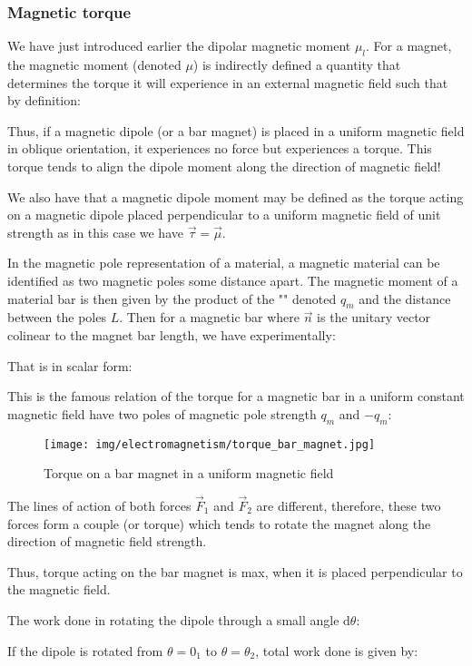 	\pagebreak
	\subsubsection{Magnetic torque}\label{magnetic torque}
	We have just introduced earlier the dipolar magnetic moment $\mu_l$. For a magnet, the magnetic moment (denoted $\mu$) is indirectly defined a quantity that determines the torque it will experience in an external magnetic field such that by definition:
	
	Thus, if a magnetic dipole (or a bar magnet) is placed in a uniform magnetic field in oblique orientation, it experiences no force but experiences a torque. This torque tends to align the dipole moment along the direction of magnetic field!
	
	We also have that a magnetic dipole moment may be defined as the torque acting on a magnetic dipole placed perpendicular to a uniform magnetic field of unit strength as in this case we have $\vec{\tau}=\vec{\mu}$.

	In the magnetic pole representation of a material, a magnetic material can be identified as two magnetic poles some distance apart. The magnetic moment of a material bar is then given by the product of the "" denoted $q_m$ and the distance between the poles $L$. Then for a magnetic bar where $\vec{n}$ is the unitary vector colinear to the magnet bar length, we have experimentally:
	
	That is in scalar form:
	
	This is the famous relation of the torque for a magnetic bar in a uniform constant magnetic field have two poles of magnetic pole strength $q_m$ and $-q_m$:
	\begin{figure}[H]
		\centering
		\texttt{[image: img/electromagnetism/torque\_bar\_magnet.jpg]}
		\caption{Torque on a bar magnet in a uniform magnetic field}
	\end{figure}
	The lines of action of both forces $\vec{F}_1$ and $\vec{F}_2$ are different, therefore, these two forces form a couple (or torque) which tends to rotate the magnet along the direction of magnetic field strength. 
	
	Thus, torque acting on the bar magnet is max, when it is placed perpendicular to the magnetic field.

	The work done in rotating the dipole through a small angle $\mathrm{d}\theta$:
	
	If the dipole is rotated from $\theta=0_1$ to $\theta=\theta_2$, total work done is given by:
	
